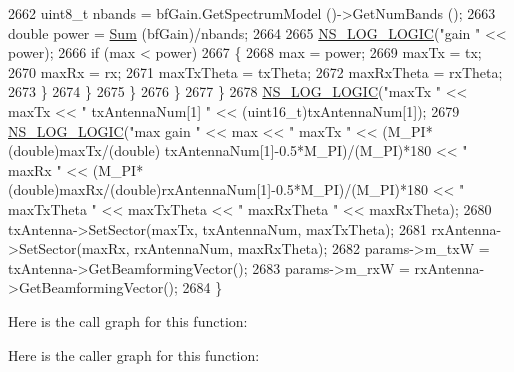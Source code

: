 \begin{DoxyCode}
2662                                         uint8\_t nbands = bfGain.GetSpectrumModel ()->GetNumBands ();
2663                                         \textcolor{keywordtype}{double} power = \hyperlink{namespacens3_afad5475661952172fe6ef1260360dad8}{Sum} (bfGain)/nbands;
2664 
2665                                         \hyperlink{group__logging_ga88acd260151caf2db9c0fc84997f45ce}{NS\_LOG\_LOGIC}(\textcolor{stringliteral}{"gain "} << power);
2666                                         \textcolor{keywordflow}{if} (max < power)
2667                                         \{
2668                                                 max = power;
2669                                                 maxTx = tx;
2670                                                 maxRx = rx;
2671                                                 maxTxTheta = txTheta;
2672                                                 maxRxTheta = rxTheta;
2673                                         \}
2674                                 \}
2675                         \}
2676                 \}
2677         \}
2678         \hyperlink{group__logging_ga88acd260151caf2db9c0fc84997f45ce}{NS\_LOG\_LOGIC}(\textcolor{stringliteral}{"maxTx "} << maxTx << \textcolor{stringliteral}{" txAntennaNum[1] "} << (uint16\_t)txAntennaNum[1]);
2679         \hyperlink{group__logging_ga88acd260151caf2db9c0fc84997f45ce}{NS\_LOG\_LOGIC}(\textcolor{stringliteral}{"max gain "} << max << \textcolor{stringliteral}{" maxTx "} << (M\_PI*(\textcolor{keywordtype}{double})maxTx/(\textcolor{keywordtype}{double})
      txAntennaNum[1]-0.5*M\_PI)/(M\_PI)*180 << \textcolor{stringliteral}{" maxRx "} << (M\_PI*(\textcolor{keywordtype}{double})maxRx/(\textcolor{keywordtype}{double})rxAntennaNum[1]-0.5*M\_PI)/(M\_PI)*180 
      << \textcolor{stringliteral}{" maxTxTheta "} << maxTxTheta << \textcolor{stringliteral}{" maxRxTheta "} << maxRxTheta);
2680         txAntenna->SetSector(maxTx, txAntennaNum, maxTxTheta);
2681         rxAntenna->SetSector(maxRx, rxAntennaNum, maxRxTheta);
2682         params->m\_txW = txAntenna->GetBeamformingVector();
2683         params->m\_rxW = rxAntenna->GetBeamformingVector();
2684 \}
\end{DoxyCode}


Here is the call graph for this function\+:




Here is the caller graph for this function\+:


